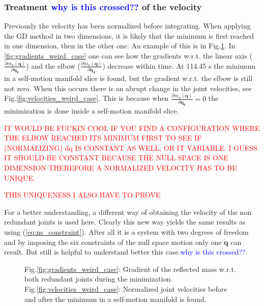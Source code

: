 \subsubsection{Treatment \textcolor{blue}{why is this crossed?? } of the velocity}

Previously the velocity has been normalized before integrating. When applying the GD method in two dimensions, it is likely that the minimum is first reached in one dimension, then in the other one. An example of this is in Fig.\ref{fig:weird case}. In \ref{fig:gradients_weird_case} one can see how the gradients w.r.t. the linear axis ($\frac{\partial {m_u(\mathbf{q})}}{\partial{\mathbf{q_{1}}}}$) and the elbow ($\frac{\partial {m_u(\mathbf{q})}}{\partial{\mathbf{q_{4}}}}$) decrease within time. At 114.45 s the minimum in a self-motion manifold slice is found, but the gradient w.r.t. the elbow is still not zero. When this occurs there is an abrupt change in the joint velocities, see Fig.\ref{fig:velocities_weird_case}.
This is because when $\frac{\partial {m_u(\mathbf{q})}}{\partial{\mathbf{q_{1}}}} = 0$ the minimization is done inside a self-motion manifold slice. 

\textcolor{red}{IT WOULD BE FUCKIN COOL IF YOU FIND A CONFIGURATION WHERE THE ELBOW REACHED ITS MINIMUM FIRST TO SEE IF (NORMALIZING) dq IS CONSTANT AS WELL, OR IT VARIABLE. I GUESS IT SHOULD BE CONSTANT BECAUSE THE NULL SPACE IS ONE DIMENSION THEREFORE A NORMALIZED VELOCITY HAS TO BE UNIQUE.}


\textcolor{red}{THIS UNIQUENESS I ALSO HAVE TO PROVE }

For a better understanding, a different way of obtaining the velocity of the non redundant joints is used here. Clearly this new way yields the same results as using  (\ref{eq:ns_constraint}). After all it is a system with two degrees of freedom and by imposing the six constraints of the null space motion only one $\mathbf{\dot{q}}$ can result. But still is helpful to understand better this case.\textcolor{blue}{why is this crossed?? }

\begin{figure}[!htb]
	\centering	
	 	 	 	
	\caption{Fig.\ref{fig:gradients_weird_case}: Gradient of the reflected mass w.r.t. both redundant joints during the minimization. \\ Fig.\ref{fig:velocities_weird_case}: Normalized joint velocities before and after the minimum in a self-motion manifold is found. }
	\label{fig:weird case}
\end{figure}





